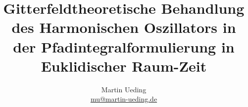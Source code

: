 

\usepackage{csquotes}


\subject{Bachelorarbeit}
\title{%
    Gitterfeldtheoretische Behandlung des Harmonischen Oszillators in der
    Pfadintegralformulierung in Euklidischer Raum-Zeit
}
\author{
    Martin Ueding \\ \small{\href{mailto:mu@martin-ueding.de}{mu@martin-ueding.de}}
}
\publishers{Prof. Dr. Carsten Urbach}



\maketitle


\nocite{Thijssen/Computational_Physics}
\nocite{Creutz/Statistical_Approach_QM}

\nocite{Blossier/Eigenvalue}
\nocite{Busch/Two_Cold}

\nocite{Young/Jackknife}
\nocite{Oser/Bootstrap}

\nocite{Stroustrup/C++4}

\IfFileExists{\bibliographyfile}{
    \printbibliography
}{}



